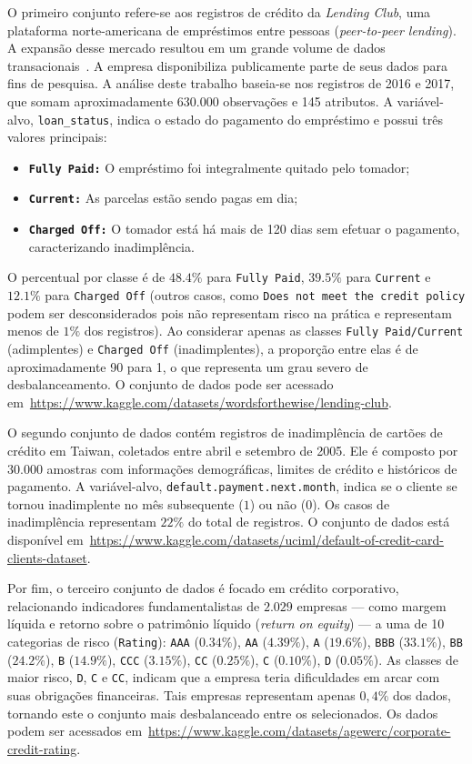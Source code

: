 O primeiro conjunto refere-se aos registros de crédito da \textit{Lending Club}, uma plataforma norte-americana de empréstimos entre pessoas (\textit{peer-to-peer lending}). A expansão desse mercado resultou em um grande volume de dados transacionais~\cite{Namvar2018}. A empresa disponibiliza publicamente parte de seus dados para fins de pesquisa. A análise deste trabalho baseia-se nos registros de 2016 e 2017, que somam aproximadamente \(630.000\) observações e 145 atributos. A variável-alvo, \texttt{loan\_status}, indica o estado do pagamento do empréstimo e possui três valores principais:
\begin{itemize}
  \item \textbf{\texttt{Fully Paid:}} O empréstimo foi integralmente quitado pelo tomador;
  \item \textbf{\texttt{Current:}} As parcelas estão sendo pagas em dia;
  \item \textbf{\texttt{Charged Off:}} O tomador está há mais de 120 dias sem efetuar o pagamento, caracterizando inadimplência.
\end{itemize}
O percentual por classe é de \(48.4\%\) para \texttt{Fully Paid}, \(39.5\%\) para \texttt{Current} e \(12.1\%\) para \texttt{Charged Off} (outros casos, como \texttt{Does not meet the credit policy} podem ser desconsiderados pois não representam risco na prática e representam menos de \(1\%\) dos registros). Ao considerar apenas as classes \texttt{Fully Paid/Current} (adimplentes) e \texttt{Charged Off} (inadimplentes), a proporção entre elas é de aproximadamente 90 para 1, o que representa um grau severo de desbalanceamento. O conjunto de dados pode ser acessado em~\url{https://www.kaggle.com/datasets/wordsforthewise/lending-club}.

O segundo conjunto de dados contém registros de inadimplência de cartões de crédito em Taiwan, coletados entre abril e setembro de 2005. Ele é composto por \(30.000\) amostras com informações demográficas, limites de crédito e históricos de pagamento. A variável-alvo, \texttt{default.payment.next.month}, indica se o cliente se tornou inadimplente no mês subsequente (\(1\)) ou não (\(0\)). Os casos de inadimplência representam \(22\%\) do total de registros. O conjunto de dados está disponível em~\url{https://www.kaggle.com/datasets/uciml/default-of-credit-card-clients-dataset}.

Por fim, o terceiro conjunto de dados é focado em crédito corporativo, relacionando indicadores fundamentalistas de \(2.029\) empresas — como margem líquida e retorno sobre o patrimônio líquido (\textit{return on equity}) — a uma de 10 categorias de risco (\texttt{Rating}): \texttt{AAA} (\(0.34\%\)), \texttt{AA} (\(4.39\%\)), \texttt{A} (\(19.6\%\)), \texttt{BBB} (\(33.1\%\)), \texttt{BB} (\(24.2\%\)), \texttt{B} (\(14.9\%\)), \texttt{CCC} (\(3.15\%\)), \texttt{CC} (\(0.25\%\)), \texttt{C} (\(0.10\%\)), \texttt{D} (\(0.05\%\)). As classes de maior risco, \texttt{D}, \texttt{C} e \texttt{CC}, indicam que a empresa teria dificuldades em arcar com suas obrigações financeiras. Tais empresas representam apenas \(0,4\%\) dos dados, tornando este o conjunto mais desbalanceado entre os selecionados. Os dados podem ser acessados em~\url{https://www.kaggle.com/datasets/agewerc/corporate-credit-rating}.

